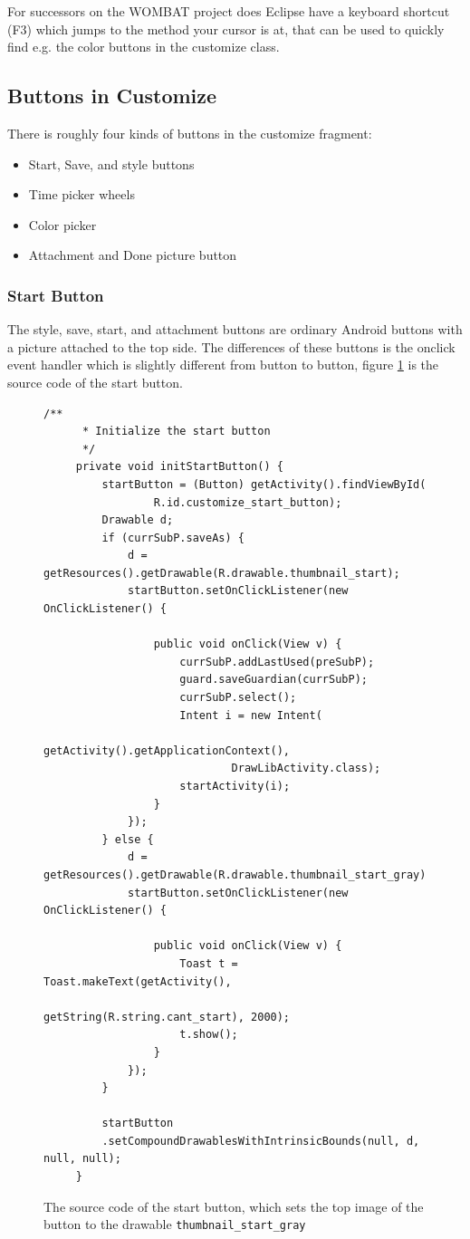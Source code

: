 For successors on the WOMBAT project does Eclipse have a keyboard shortcut (F3) which jumps to the method your cursor is at, that can be used to quickly find e.g. the color buttons in the customize class.

\subsection{Buttons in Customize}
There is roughly four kinds of buttons in the customize fragment:

\begin{itemize}
	\item Start, Save, and style buttons
	\item Time picker wheels
	\item Color picker
	\item Attachment and Done picture button
\end{itemize}

\subsubsection*{Start Button}
The style, save, start, and attachment buttons are ordinary Android buttons with a picture attached to the top side.
The differences of these buttons is the onclick event handler which is slightly different from button to button, figure \ref{code:customize:start_button} is the source code of the start button.

\begin{figure}[H]
\begin{verbatim}
/**
	  * Initialize the start button
	  */
	 private void initStartButton() {
		 startButton = (Button) getActivity().findViewById(
				 R.id.customize_start_button);
		 Drawable d;
		 if (currSubP.saveAs) {
			 d = getResources().getDrawable(R.drawable.thumbnail_start);
			 startButton.setOnClickListener(new OnClickListener() {

				 public void onClick(View v) {
					 currSubP.addLastUsed(preSubP);
					 guard.saveGuardian(currSubP);
					 currSubP.select();
					 Intent i = new Intent(
							 getActivity().getApplicationContext(),
							 DrawLibActivity.class);
					 startActivity(i);
				 }
			 });
		 } else {
			 d = getResources().getDrawable(R.drawable.thumbnail_start_gray);
			 startButton.setOnClickListener(new OnClickListener() {

				 public void onClick(View v) {
					 Toast t = Toast.makeText(getActivity(),
							 getString(R.string.cant_start), 2000);
					 t.show();
				 }
			 });
		 }

		 startButton
		 .setCompoundDrawablesWithIntrinsicBounds(null, d, null, null);
	 }
\end{verbatim}
\caption{The source code of the start button, which sets the top image of the button to the drawable \tt thumbnail\_start\_gray}%
\label{code:customize:start_button}%
\end{figure}

